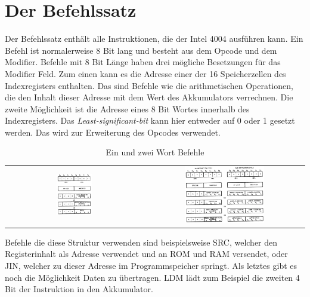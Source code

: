 \section{Der Befehlssatz}
\label{ch:befehlssatz}
Der Befehlssatz enthält alle Instruktionen, die der Intel 4004 ausführen kann. Ein Befehl ist normalerweise 8 Bit lang und besteht aus dem Opcode und dem Modifier. Befehle mit 8 Bit Länge haben drei mögliche Besetzungen für das Modifier Feld. Zum einen kann es die Adresse einer der 16 Speicherzellen des Indexregisters enthalten. Das sind Befehle wie die arithmetischen Operationen, die den Inhalt dieser Adresse mit dem Wert des Akkumulators verrechnen. Die zweite Möglichkeit ist die Adresse eines 8 Bit Wortes innerhalb des Indexregisters. Das \textit{Least-significant-bit} kann hier entweder auf 0 oder 1 gesetzt werden. Das wird zur Erweiterung des Opcodes verwendet.
\begin{table}[H]
	\begin{tabular}{c c}
			 	\includegraphics[width=0.27\textwidth]{figures/instruction_one.png}
			 	\label{fig:instructions1}
			 	&
			 	\includegraphics[width=0.52\textwidth]{figures/instruction_two.png}
			 	\label{fig:instructions2}
	\end{tabular}
	\caption{Ein und zwei Wort Befehle}
\end{table}
Befehle die diese Struktur verwenden sind beispielsweise SRC, welcher den Registerinhalt als Adresse verwendet und an ROM und RAM versendet, oder JIN, welcher zu dieser Adresse im Programmspeicher springt. Als letztes gibt es noch die Möglichkeit Daten zu übertragen. LDM lädt zum Beispiel die zweiten 4 Bit der Instruktion in den Akkumulator.
